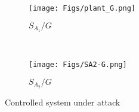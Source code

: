 \begin{figure}[thpb]
\begin{subfigure}[t]{0.45\columnwidth}
\centering
\texttt{[image: Figs/plant\_G.png]}
\caption{$S_{A_1}/G$}
\label{fig:SA1/G}
\end{subfigure}
\ 
\begin{subfigure}[t]{0.45\columnwidth}
\centering
\texttt{[image: Figs/SA2-G.png]}
\caption{$S_{A_2}/G$}
\label{fig:SA2/G}
\end{subfigure}
\caption{Controlled system under attack}
\label{fig:SA/G}
\vspace{-2em}
\end{figure}



